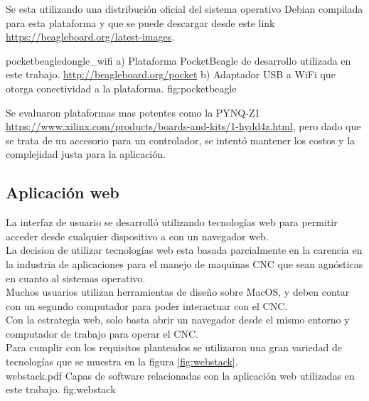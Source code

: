    Se esta utilizando una distribución oficial del sistema operativo Debian compilada para esta plataforma y que se puede descargar desde este link \url{https://beagleboard.org/latest-images}.


         {pocketbeagle}{dongle_wifi}
         {a) Plataforma PocketBeagle de desarrollo utilizada en este trabajo. \url{http://beagleboard.org/pocket} b) Adaptador USB a WiFi que otorga conectividad a la plataforma. }
         {fig:pocketbeagle}

         Se evaluaron plataformas mas potentes como la PYNQ-Z1 \url{https://www.xilinx.com/products/boards-and-kits/1-hydd4z.html}, pero dado que se trata de un accesorio para un controlador, se intentó mantener los costos y la complejidad justa para la aplicación.\\
   

\subsection{Aplicación web}
   La interfaz de usuario se desarrolló utilizando tecnologías web para permitir acceder desde cualquier dispositivo a con un navegador web.\\
   La decision de utilizar tecnologías web esta basada parcialmente en la carencia en la industria de aplicaciones para el manejo de maquinas CNC que sean agnósticas en cuanto al sistemas operativo. \\
Muchos usuarios utilizan herramientas de diseño sobre MacOS, y deben contar con un segundo computador para poder interactuar con el CNC.\\
   Con la estrategia web, solo basta abrir un navegador desde el mismo entorno y computador de trabajo para operar el CNC.\\
   Para cumplir con los requisitos planteados se utilizaron una gran variedad de tecnologías que se muestra en la figura \ref{fig:webstack}.\\
            {webstack.pdf}
            {Capas de software relacionadas con la aplicación web utilizadas en este trabajo.}
            {fig:webstack}

